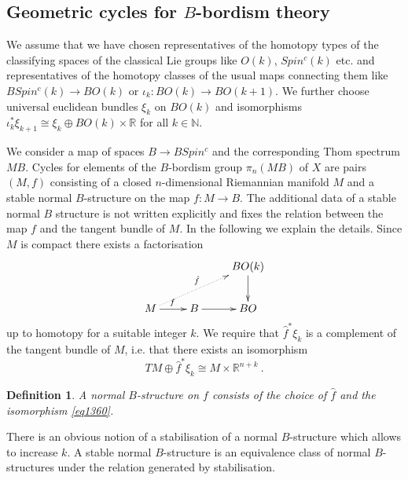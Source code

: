 \documentclass[12pt]{article}
\newtheorem{ddd}[theorem]{Definition}
\newcommand{\nat}{{\mathbb{N}}}
\newcommand{\R}{{\mathbb{R}}}
\begin{document}
%

%





\subsection{Geometric cycles for $B$-bordism theory}\label{sec1400}

We assume that we have chosen representatives of the homotopy types of the classifying spaces of the classical Lie groups like $O(k)$, $Spin^{c}(k)$ etc. and representatives of the homotopy classes  of the usual maps connecting them like $BSpin^{c}(k)\to BO(k)$ or $\iota_{k}:BO(k)\to BO(k+1)$.
We further choose universal euclidean bundles $\xi_{k}$ on $BO(k)$ and isomorphisms
$\iota_{k}^{*}\xi_{k+1}\cong \xi_{k}\oplus BO(k)\times \R$ for all $k\in \nat$.

We consider a map of spaces  $B\to BSpin^{c}$ and the corresponding Thom spectrum $MB$.
Cycles for elements of the $B$-bordism group $\pi_{n}(MB )$ of $X$ are pairs $(M,f)$ consisting of      a closed $n$-dimensional Riemannian manifold   $M$ and a stable normal $B$-structure  on the map  $f:M\to B$.  The additional data of a stable normal $B$ structure is not written explicitly and fixes the relation between the map $f$ and the tangent bundle of $M$.
In the following we explain the details. Since $M$ is compact   there exists a factorisation
$$\xymatrix{&&BO(k)\ar[d]\\M\ar@{.>}[urr]^{\hat f}\ar[r]^{f}&B\ar[r]&BO}$$
up to homotopy for a suitable integer $k$.
 We require that $\hat f^{*} \xi_{k}$ is a complement of the tangent bundle of $M$, i.e. that there exists an isomorphism
 \begin{equation}\label{eq1360}TM\oplus \hat f^{*}\xi_{k}\cong M\times \R^{n+k}\ .\end{equation}
\begin{ddd} A normal $B$-structure on $f$ consists of the choice of $\hat f$ and the isomorphism \eqref{eq1360}.
 \end{ddd}
 There is an obvious notion of a stabilisation of a normal $B$-structure which allows to increase $k$. A stable normal $B$-structure is an equivalence class of normal $B$-structures under the relation generated by stabilisation.
 
  
   
\end{document}
